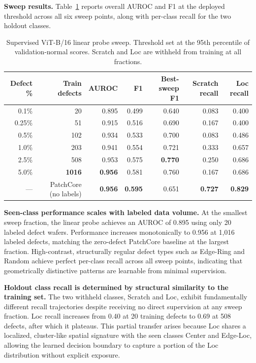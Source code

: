 \documentclass[11pt]{article}
\begin{document}
\textbf{Sweep results.} Table~\ref{tab:supervised_sweep} reports overall AUROC and F1 at the deployed threshold across all six sweep points, along with per-class recall for the two holdout classes.

\begin{table}[H]
\centering
\caption{Supervised ViT-B/16 linear probe sweep. Threshold set at the 95th percentile of validation-normal scores. Scratch and Loc are withheld from training at all fractions.}
\label{tab:supervised_sweep}
\begin{tabular}{rrrrrrr}
\toprule
Defect \% & Train defects & AUROC & F1 & Best-sweep F1 & Scratch recall & Loc recall \\
\midrule
0.1\%  & 20            & 0.895          & 0.499          & 0.640          & 0.083          & 0.400          \\
0.25\% & 51            & 0.915          & 0.516          & 0.690          & 0.167          & 0.400          \\
0.5\%  & 102           & 0.934          & 0.533          & 0.700          & 0.083          & 0.486          \\
1.0\%  & 203           & 0.941          & 0.554          & 0.721          & 0.333          & 0.657          \\
2.5\%  & 508           & 0.953          & 0.575          & \textbf{0.770} & 0.250          & 0.686          \\
5.0\%  & \textbf{1016} & \textbf{0.956} & 0.581          & 0.760          & 0.167          & 0.686          \\
\midrule
--- & PatchCore (no labels) & \textbf{0.956} & \textbf{0.595} & 0.651 & \textbf{0.727} & \textbf{0.829} \\
\bottomrule
\end{tabular}
\end{table}

\textbf{Seen-class performance scales with labeled data volume.} At the smallest sweep fraction, the linear probe achieves an AUROC of 0.895 using only 20 labeled defect wafers. Performance increases monotonically to 0.956 at 1,016 labeled defects, matching the zero-defect PatchCore baseline at the largest fraction. High-contrast, structurally regular defect types such as Edge-Ring and Random achieve perfect per-class recall across all sweep points, indicating that geometrically distinctive patterns are learnable from minimal supervision.

\textbf{Holdout class recall is determined by structural similarity to the training set.} The two withheld classes, Scratch and Loc, exhibit fundamentally different recall trajectories despite receiving no direct supervision at any sweep fraction. Loc recall increases from 0.40 at 20 training defects to 0.69 at 508 defects, after which it plateaus. This partial transfer arises because Loc shares a localized, cluster-like spatial signature with the seen classes Center and Edge-Loc, allowing the learned decision boundary to capture a portion of the Loc distribution without explicit exposure.
\end{document}
